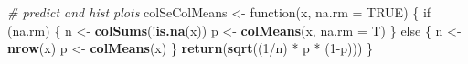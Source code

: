 \documentclass[11pt,,]{article}
\newenvironment{Shaded}{\begin{snugshade}}{\end{snugshade}}
\newcommand{\KeywordTok}[1]{\textcolor[rgb]{0.13,0.29,0.53}{\textbf{{#1}}}}
\newcommand{\DataTypeTok}[1]{\textcolor[rgb]{0.13,0.29,0.53}{{#1}}}
\newcommand{\DecValTok}[1]{\textcolor[rgb]{0.00,0.00,0.81}{{#1}}}
\newcommand{\StringTok}[1]{\textcolor[rgb]{0.31,0.60,0.02}{{#1}}}
\newcommand{\CommentTok}[1]{\textcolor[rgb]{0.56,0.35,0.01}{\textit{{#1}}}}
\newcommand{\OtherTok}[1]{\textcolor[rgb]{0.56,0.35,0.01}{{#1}}}
\newcommand{\NormalTok}[1]{{#1}}
\begin{document}
\begin{Shaded}
\begin{Highlighting}[]
\CommentTok{# predict and hist plots}
\NormalTok{colSeColMeans <-}\StringTok{ }\NormalTok{function(x, }\DataTypeTok{na.rm =} \OtherTok{TRUE}\NormalTok{) \{}
    \NormalTok{if (na.rm) \{ }
        \NormalTok{n <-}\StringTok{ }\KeywordTok{colSums}\NormalTok{(!}\KeywordTok{is.na}\NormalTok{(x)) }
        \NormalTok{p <-}\StringTok{ }\KeywordTok{colMeans}\NormalTok{(x, }\DataTypeTok{na.rm =} \NormalTok{T)}
    \NormalTok{\} }
    \NormalTok{else \{}
        \NormalTok{n <-}\StringTok{ }\KeywordTok{nrow}\NormalTok{(x) }
        \NormalTok{p <-}\StringTok{ }\KeywordTok{colMeans}\NormalTok{(x)}
    \NormalTok{\}}
    \KeywordTok{return}\NormalTok{(}\KeywordTok{sqrt}\NormalTok{((}\DecValTok{1}\NormalTok{/n) *}\StringTok{ }\NormalTok{p *}\StringTok{ }\NormalTok{(}\DecValTok{1}\NormalTok{-p)))}
\NormalTok{\}}


\end{Highlighting}
\end{Shaded}
\end{document}
